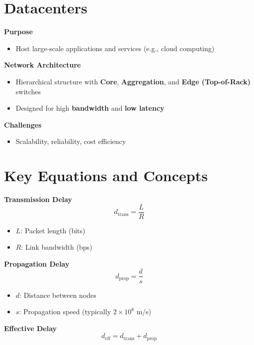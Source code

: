 \documentclass[9pt]{extarticle}
\begin{document}
\begin{multicols*}{3}
{\color{sectioncolor}\section*{\centering Datacenters}}
\textbf{Purpose}
\begin{itemize}
    \item Host large-scale applications and services (e.g., cloud computing)
\end{itemize}

\textbf{Network Architecture}
\begin{itemize}
    \item Hierarchical structure with \textbf{Core}, \textbf{Aggregation}, and \textbf{Edge (Top-of-Rack)} switches
    \item Designed for high \textbf{bandwidth} and \textbf{low latency}
\end{itemize}

\textbf{Challenges}
\begin{itemize}
    \item Scalability, reliability, cost efficiency
\end{itemize}

{\color{sectioncolor}\section*{\centering Key Equations and Concepts}}
\textbf{Transmission Delay}
\[
d_{\text{trans}} = \frac{L}{R}
\]
\begin{itemize}
    \item \( L \): Packet length (bits)
    \item \( R \): Link bandwidth (bps)
\end{itemize}

\textbf{Propagation Delay}
\[
d_{\text{prop}} = \frac{d}{s}
\]
\begin{itemize}
    \item \( d \): Distance between nodes
    \item \( s \): Propagation speed (typically \( 2 \times 10^8 \) m/s)
\end{itemize}

\textbf{Effective Delay}
\[
d_{\text{eff}} = d_{\text{trans}} + d_{\text{prop}}
\]


\end{multicols*}
\end{document}
